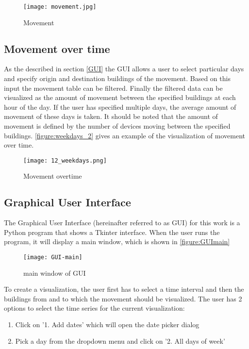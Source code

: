 \begin{figure}[H]
\centering
\texttt{[image: movement.jpg]}
\captionsetup{justification=centering}
\caption{Movement}
\label{figure:movement}
\end{figure}


\subsection{Movement over time}

As the described in section \autoref{GUI} the GUI allows a user to select particular days and specify origin and destination buildings of the movement. Based on this input the movement table can be filtered. Finally the filtered data can be visualized as the amount of movement between the specified buildings at each hour of the day. If the user has specified multiple days, the average amount of movement of these days is taken. It should be noted that the amount of movement is defined by the number of devices moving between the specified buildings. \autoref{figure:weekdays_2} gives an example of the visualization of movement over time.
\begin{figure}[H]
\centering
\texttt{[image: 12\_weekdays.png]}
\captionsetup{justification=centering}
\caption{Movement overtime}
\label{figure:weekdays_2}
\end{figure}


\subsection{Graphical User Interface}\label{GUI}
The Graphical User Interface (hereinafter referred to as GUI) for this work is a Python program that shows a Tkinter interface. When the user runs the program, it will display a main window, which is shown in \autoref{figure:GUImain}
\begin{figure}[H]
\centering
\texttt{[image: GUI-main]}
\captionsetup{justification=centering}
\caption{main window of GUI}
\label{figure:GUImain}
\end{figure}
\pagebreak 
To create a visualization, the user first has to select a time interval and then the buildings from and to which the movement should be visualized. The user has 2 options to select the time series for the current visualization:
\begin{enumerate}
\item Click on '1. Add dates' which will open the date picker dialog
\item Pick a day from the dropdown menu and click on '2. All days of week' 
\end{enumerate}


